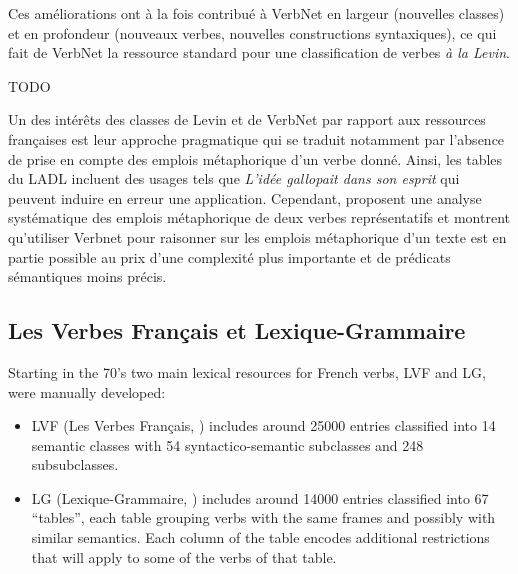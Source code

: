 Ces améliorations ont à la fois contribué à VerbNet en largeur (nouvelles
classes) et en profondeur (nouveaux verbes, nouvelles constructions
syntaxiques), ce qui fait de VerbNet la ressource standard pour une
classification de verbes \textit{à la Levin}.

TODO

Un des intérêts des classes de Levin et de VerbNet par rapport aux ressources
françaises est leur approche pragmatique qui se traduit notamment par l'absence
de prise en compte des emplois métaphorique d'un verbe donné. Ainsi, les tables
du LADL incluent des usages tels que \textit{L'idée gallopait dans son esprit}
qui peuvent induire en erreur une application. Cependant,
\cite{brown2012semantic} proposent une analyse systématique des emplois
métaphorique de deux verbes représentatifs et montrent qu'utiliser Verbnet pour
raisonner sur les emplois métaphorique d'un texte est en partie possible au
prix d'une complexité plus importante et de prédicats sémantiques moins précis.


\subsection{Les Verbes Français et Lexique-Grammaire}

Starting in the 70's two main lexical resources for French verbs, LVF and LG,
were manually developed:


\begin{itemize}

    \item LVF (Les Verbes Français, \cite{dubois1997verbes}) includes around
    25000 entries classified into 14 semantic classes with 54 syntactico-semantic
    subclasses and 248 subsubclasses.

    \item LG (Lexique-Grammaire, \cite{gross1975methodes,boons1976structure})
    includes around 14000 entries classified into 67 ``tables'', each table
    grouping verbs with the same frames and possibly with similar semantics. Each
    column of the table encodes additional restrictions that will apply to some of
    the verbs of that table.


\end{itemize}

